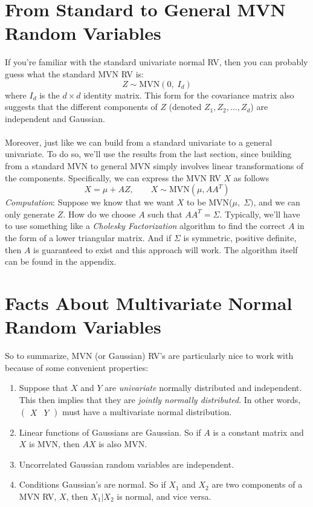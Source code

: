 \documentclass[a4paper,12pt]{scrartcl}
\begin{document}
\newpage
\section{From Standard to General MVN Random Variables}

If you're familiar with the standard univariate normal RV,
then you can probably guess what the standard MVN RV is:
\begin{equation}
    {Z} \sim \text{MVN}(0, \; I_d) 
\end{equation}
where $I_d$ is the $d\times d$ identity matrix.  This form for
the covariance matrix also suggests that the different components
of ${Z}$ (denoted $Z_1, Z_2, \ldots, Z_d$) are independent and
Gaussian.
\\
\\
Moreover, just like we can build from a standard univariate to
a general univariate.  To do so, we'll use the results from the 
last section, since building from a standard MVN
to general MVN simply involves linear transformations of the components.
Specifically, we can express the MVN RV ${X}$ as follows
\begin{equation}
    {X} = \mu + A{Z}, \qquad {X}\sim 
	\text{MVN}(\mu, AA^T)
\end{equation}
{\sl Computation}: Suppose we know that we want ${X}$ to
be MVN($\mu, \; \Sigma)$, and we can only generate ${Z}$.
How do we choose $A$ such that $AA^T = \Sigma$.  Typically, we'll
have to use something like a \emph{Cholesky Factorization}
algorithm to find the correct $A$ in the form of a lower triangular
matrix. And if $\Sigma$ is symmetric, positive definite, then 
$A$ is guaranteed to exist and this approach will work. 
The algorithm itself can be found in the appendix.


\section{Facts About Multivariate Normal Random Variables}

So to summarize, MVN (or Gaussian) RV's are particularly nice to work with because
of some convenient properties:
\begin{enumerate}
    \item Suppose that ${X}$ and ${Y}$ are \emph{univariate}
	normally distributed and independent. This then implies that they are 
	\emph{jointly normally distributed}. In other words, 
	$\begin{pmatrix} {X} & {Y} \end{pmatrix}$ must have a multivariate
	normal distribution. 
    \item Linear functions of Gaussians are Gaussian. So if $A$
	is a constant matrix and ${X}$ is MVN, then $A{X}$
	is also MVN.
    \item Uncorrelated Gaussian random variables are independent.
    \item Conditions Gaussian's are normal. So if $X_1$ and $X_2$
	are two components of a MVN RV, ${X}$, then 
	$X_1 | X_2$ is normal, and vice versa.
\end{enumerate}
\end{document}
